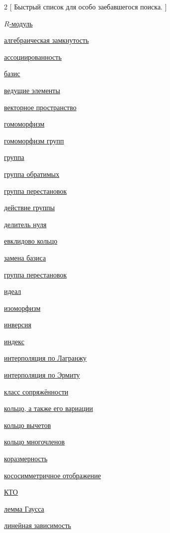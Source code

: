 \documentclass[a4paper,100pt]{article}
\theoremstyle{indented}
\theoremstyle{definition}
\theoremstyle{remark}
\begin{document}
\begin{multicols}{2}
    [
    Быстрый список для особо заебавшегося поиска.
    ]

    \hyperlink{n42}{$R$-модуль}\
    
    \hyperlink{n39}{алгебраическая замкнутость}\
    
    \hyperlink{n4}{ассоциированность}\

    \hyperlink{n45}{базис}\

    \hyperlink{n61}{ведущие элементы}\

    \hyperlink{n46}{векторное пространство}\

    \hyperlink{n19}{гомоморфизм}\

    \hyperlink{n86}{гомоморфизм групп}\

    \hyperlink{n66}{группа}\

    \hyperlink{n84}{группа обратимых}\

    \hyperlink{n72}{группа перестановок}\

    \hyperlink{n78}{действие группы}\
    
    \hyperlink{n3}{делитель нуля}\

    \hyperlink{n5}{евклидово кольцо}\

    \hyperlink{n54}{замена базиса}\

    \hyperlink{n77}{группа перестановок}\

    \hyperlink{n9}{идеал}\

    \hyperlink{n22}{изоморфизм}\

    \hyperlink{n76}{инверсия}\

    \hyperlink{n89}{индекс}\

    \hyperlink{n35}{интерполяция по Лагранжу}\

    \hyperlink{n36}{интерполяция по Эрмиту}\

    \hyperlink{n83}{класс сопряжённости}\
    
    \hyperlink{n1}{кольцо, а также его вариации}\

    \hyperlink{n14}{кольцо вычетов}\

    \hyperlink{n28}{кольцо многочленов}\

    \hyperlink{n51}{коразмерность}\

    \hyperlink{n96}{кососимметричное отображение}\

    \hyperlink{n15}{КТО}\

    \hyperlink{n31}{лемма Гаусса}\

    \hyperlink{n43}{линейная зависимость}\


\end{multicols}
\end{document}

